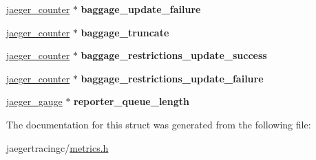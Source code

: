 \begin{DoxyCompactItemize}
\item 
\mbox{\label{structjaeger__metrics_abfead10276cee847a51ebe876f046f4c}} 
\mbox{\hyperlink{structjaeger__counter}{jaeger\+\_\+counter}} $\ast$ {\bfseries baggage\+\_\+update\+\_\+failure}
\item 
\mbox{\label{structjaeger__metrics_a70ef423c8ce797bb347e23d6126d7460}} 
\mbox{\hyperlink{structjaeger__counter}{jaeger\+\_\+counter}} $\ast$ {\bfseries baggage\+\_\+truncate}
\item 
\mbox{\label{structjaeger__metrics_a652fdb1f98db15c1d98c7d2e3de1a0c6}} 
\mbox{\hyperlink{structjaeger__counter}{jaeger\+\_\+counter}} $\ast$ {\bfseries baggage\+\_\+restrictions\+\_\+update\+\_\+success}
\item 
\mbox{\label{structjaeger__metrics_a895f9cd11eee0df58aa10b2fb0421437}} 
\mbox{\hyperlink{structjaeger__counter}{jaeger\+\_\+counter}} $\ast$ {\bfseries baggage\+\_\+restrictions\+\_\+update\+\_\+failure}
\item 
\mbox{\label{structjaeger__metrics_a44956023a02fb10ed14d96aa00790cc7}} 
\mbox{\hyperlink{structjaeger__gauge}{jaeger\+\_\+gauge}} $\ast$ {\bfseries reporter\+\_\+queue\+\_\+length}
\end{DoxyCompactItemize}


The documentation for this struct was generated from the following file\+:\begin{DoxyCompactItemize}
\item 
jaegertracingc/\mbox{\hyperlink{metrics_8h}{metrics.\+h}}\end{DoxyCompactItemize}
